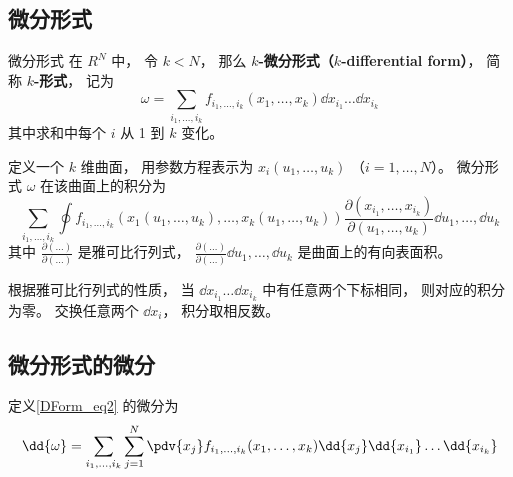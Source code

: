 \subsection{微分形式}
\begin{definition}{微分形式}
在 $R^N$ 中， 令 $k < N$， 那么 \textbf{$k$-微分形式（$k$-differential form）}， 简称 \textbf{$k$-形式}， 记为
\begin{equation}\label{DForm_eq2}
\omega = \sum_{i_1,\dots,i_k} f_{i_1,\dots,i_k}(x_1,\dots,x_k) \dd{x_{i_1}}\dots\dd{x_{i_k}}
\end{equation}
其中求和中每个 $i$ 从 1 到 $k$ 变化。

定义一个 $k$ 维曲面， 用参数方程表示为 $x_i(u_1,\dots,u_k)$ （$i=1,\dots,N$）。 微分形式 $\omega$ 在该曲面上的积分为
\begin{equation}
\sum_{i_1,\dots,i_k} \oint f_{i_1,\dots,i_k}(x_1(u_1,\dots,u_k),\dots,x_k(u_1,\dots,u_k)) \frac{\partial(x_{i_1},\dots,x_{i_k})}{\partial(u_1,\dots,u_k)} \dd{u_1},\dots,\dd{u_k}
\end{equation}
其中 $\frac{\partial(\dots)}{\partial(\dots)}$ 是雅可比行列式， $\frac{\partial(\dots)}{\partial(\dots)}\dd{u_1},\dots,\dd{u_k}$ 是曲面上的有向表面积。
\end{definition}
根据雅可比行列式的性质， 当 $\dd{x_{i_1}}\dots\dd{x_{i_k}}$ 中有任意两个下标相同， 则对应的积分为零。 交换任意两个 $\dd{x_i}$， 积分取相反数。

\subsection{微分形式的微分}
定义\autoref{DForm_eq2} 的微分为
\begin{equation}
\dd{\omega} = \sum_{i_1,\dots,i_k}\sum_{j=1}^N \pdv{x_j} f_{i_1,\dots,i_k}(x_1,\dots,x_k) \dd{x_j}\dd{x_{i_1}}\dots\dd{x_{i_k}}
\end{equation}

